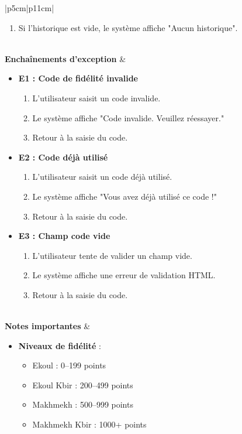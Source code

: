 \begin{longtable}{|p{5cm}|p{11cm}|}
\begin{minipage}{\linewidth}
\begin{itemize}
\begin{enumerate}
\item Si l'historique est vide, le système affiche "Aucun historique".
\end{enumerate}
\end{itemize}
\end{minipage} \\ 
\hline
\textbf{Enchaînements d'exception} &
\begin{minipage}{\linewidth}
\begin{itemize}
\setlength{\itemsep}{3pt}
\item \textbf{E1 : Code de fidélité invalide}
\begin{enumerate}
\item L'utilisateur saisit un code invalide.
\item Le système affiche "Code invalide. Veuillez réessayer."
\item Retour à la saisie du code.
\end{enumerate}
\item \textbf{E2 : Code déjà utilisé}
\begin{enumerate}
\item L'utilisateur saisit un code déjà utilisé.
\item Le système affiche "Vous avez déjà utilisé ce code !"
\item Retour à la saisie du code.
\end{enumerate}
\item \textbf{E3 : Champ code vide}
\begin{enumerate}
\item L'utilisateur tente de valider un champ vide.
\item Le système affiche une erreur de validation HTML.
\item Retour à la saisie du code.
\end{enumerate}
\end{itemize}
\end{minipage} \\ 
\hline
\textbf{Notes importantes} &
\begin{minipage}{\linewidth}
\begin{itemize}
\setlength{\itemsep}{2pt}
\item \textbf{Niveaux de fidélité} :
  \begin{itemize}
  \item Ekoul : 0–199 points
  \item Ekoul Kbir : 200–499 points
  \item Makhmekh : 500–999 points
  \item Makhmekh Kbir : 1000+ points

\end{itemize}
\end{itemize}
\end{minipage}
\end{longtable}
